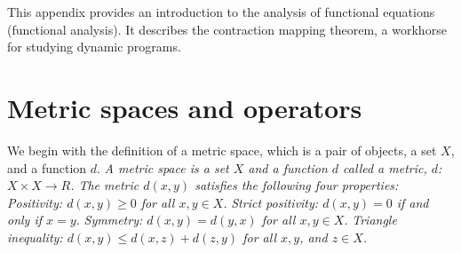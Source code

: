 
%

%
This appendix provides an introduction to the analysis of functional equations
(functional analysis).  It describes the contraction mapping theorem,
a workhorse for studying dynamic programs.

\section{Metric spaces and operators}

We begin with the definition of a metric space, which is a pair of objects, a
set $X$, and a function $d$.
\medskip
{\it A metric space is a set $X$ and a function $d$
called a metric, $d$: $X\times X\to R$.  The metric $d(x,y)$ satisfies the
following four properties:}
\medskip
{} {\it Positivity: $d(x,y)\ge 0$ for all $x,y\in X$.}
\medskip
{} {\it Strict positivity: $d(x,y)=0$ if and only if $x=y$.}
\medskip
{} {\it Symmetry: $d(x,y)=d(y,x)$ for all $x,y\in X$.}
\medskip
{} {\it Triangle inequality: $d(x,y)\le d(x,z)+d(z,y)$ for all $x,
y$,
and $z\in X$.}
\enddefinition
\medskip

